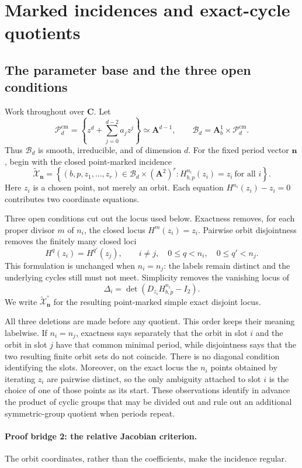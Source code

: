 \documentclass[11pt]{article}
\theoremstyle{definition}
\theoremstyle{remark}
\newcommand{\C}{\mathbf C}
\newcommand{\A}{\mathbf A}
\newcommand{\cB}{\mathcal B}
\newcommand{\cP}{\mathcal P}
\newcommand{\tX}{\widetilde{\mathcal X}}
\newcommand{\bn}{\mathbf n}
\begin{document}
\section{Marked incidences and exact-cycle quotients}
\label{sec:incidence}

\subsection{The parameter base and the three open conditions}

Work throughout over $\C$.  Let
\[
  \cP_d^{\mathrm{cm}}
  =
  \left\{
    z^d+\sum_{j=0}^{d-2}a_jz^j
  \right\}
  \simeq\A^{d-1},
  \qquad
  \cB_d=\A^1_b\times\cP_d^{\mathrm{cm}}.
\]
Thus $\cB_d$ is smooth, irreducible, and of dimension $d$.  For the fixed
period vector $\bn$, begin with the closed point-marked incidence
\[
  \tX_{\bn}
  =
  \left\{
    (b,p,z_1,\ldots,z_r)\in
    \cB_d\times(\A^2)^r:
    H_{b,p}^{n_i}(z_i)=z_i\ \text{for all }i
  \right\}.
\]
Here $z_i$ is a chosen point, not merely an orbit.  Each equation
$H^{n_i}(z_i)-z_i=0$ contributes two coordinate equations.

Three open conditions cut out the locus used below.  Exactness removes, for
each proper divisor $m$ of $n_i$, the closed locus
$H^m(z_i)=z_i$.  Pairwise orbit disjointness removes the finitely many
closed loci
\[
  H^q(z_i)=H^{q'}(z_j),
  \qquad
  i\neq j,\quad
  0\leq q<n_i,\quad 0\leq q'<n_j.
\]
This formulation is unchanged when $n_i=n_j$: the labels remain distinct
and the underlying cycles still must not meet.  Simplicity removes the
vanishing locus of
\[
  \Delta_i=\det(D_{z_i}H_{b,p}^{n_i}-I_2).
\]
We write $\tX_{\bn}^{\circ}$ for the resulting point-marked simple exact
disjoint locus.

All three deletions are made before any quotient.  This order keeps their
meaning labelwise.  If $n_i=n_j$, exactness says separately that the orbit
in slot $i$ and the orbit in slot $j$ have that common minimal period, while
disjointness says that the two resulting finite orbit sets do not coincide.
There is no diagonal condition identifying the slots.  Moreover, on the
exact locus the $n_i$ points obtained by iterating $z_i$ are pairwise
distinct, so the only ambiguity attached to slot $i$ is the choice of one
of those points as its start.  These observations identify in advance the
product of cyclic groups that may be divided out and rule out an additional
symmetric-group quotient when periods repeat.

\paragraph{Proof bridge 2: the relative Jacobian criterion.}
The orbit coordinates, rather than the coefficients, make the incidence
regular.
\end{document}
